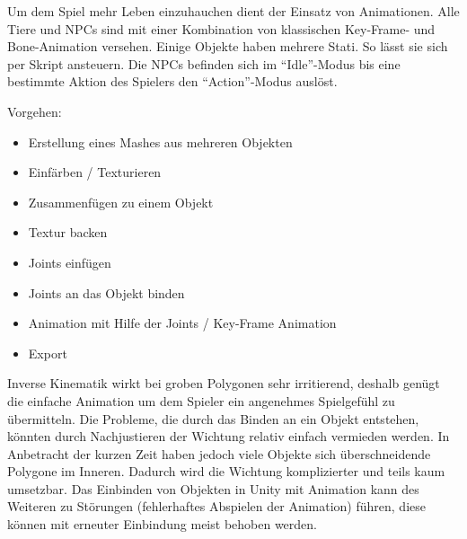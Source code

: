 
Um dem Spiel mehr Leben einzuhauchen dient der Einsatz von Animationen. Alle Tiere und NPCs sind mit einer Kombination von klassischen Key-Frame- und Bone-Animation versehen. Einige Objekte haben mehrere Stati. So lässt sie sich per Skript ansteuern. Die NPCs befinden sich im \enquote{Idle}-Modus bis eine bestimmte Aktion des Spielers den \enquote{Action}-Modus auslöst.

Vorgehen:
\begin{itemize}
\item Erstellung eines Mashes aus mehreren Objekten
\item Einfärben / Texturieren
\item Zusammenfügen zu einem Objekt
\item Textur backen
\item Joints einfügen
\item Joints an das Objekt binden
\item Animation mit Hilfe der Joints / Key-Frame Animation
\item Export
\end{itemize}

Inverse Kinematik wirkt bei groben Polygonen sehr irritierend, deshalb genügt die einfache Animation um dem Spieler ein angenehmes Spielgefühl zu übermitteln. Die Probleme, die durch das Binden an ein Objekt entstehen, könnten durch Nachjustieren der Wichtung relativ einfach vermieden werden. In Anbetracht der kurzen Zeit haben jedoch viele Objekte sich überschneidende Polygone im Inneren. Dadurch wird die Wichtung komplizierter und teils kaum umsetzbar. Das Einbinden von Objekten in Unity mit Animation kann des Weiteren zu Störungen (fehlerhaftes Abspielen der Animation) führen, diese können mit erneuter Einbindung meist behoben werden. 
